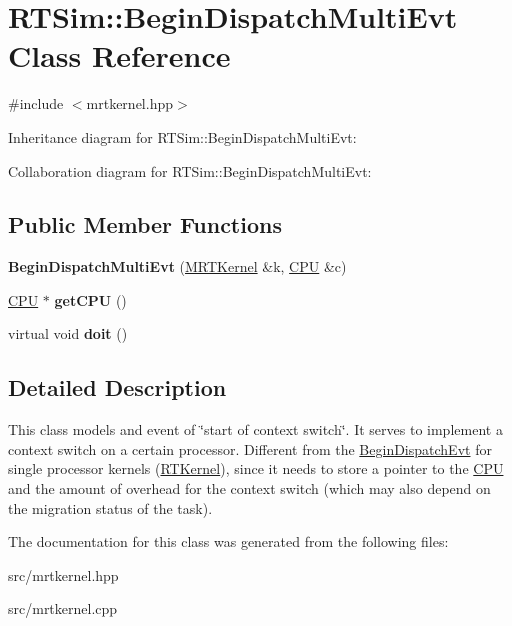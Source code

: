 \hypertarget{classRTSim_1_1BeginDispatchMultiEvt}{}\section{R\+T\+Sim\+:\+:Begin\+Dispatch\+Multi\+Evt Class Reference}
\label{classRTSim_1_1BeginDispatchMultiEvt}


{\ttfamily \#include $<$mrtkernel.\+hpp$>$}



Inheritance diagram for R\+T\+Sim\+:\+:Begin\+Dispatch\+Multi\+Evt\+:


Collaboration diagram for R\+T\+Sim\+:\+:Begin\+Dispatch\+Multi\+Evt\+:
\subsection*{Public Member Functions}
\begin{DoxyCompactItemize}
\item 
{\bfseries Begin\+Dispatch\+Multi\+Evt} (\hyperlink{classRTSim_1_1MRTKernel}{M\+R\+T\+Kernel} \&k, \hyperlink{classRTSim_1_1CPU}{C\+PU} \&c)\hypertarget{classRTSim_1_1BeginDispatchMultiEvt_a73517b699d6df307277cac0afeec7f8e}{}\label{classRTSim_1_1BeginDispatchMultiEvt_a73517b699d6df307277cac0afeec7f8e}

\item 
\hyperlink{classRTSim_1_1CPU}{C\+PU} $\ast$ {\bfseries get\+C\+PU} ()\hypertarget{classRTSim_1_1BeginDispatchMultiEvt_aebb18e69fb801e86bc079a8f91b04253}{}\label{classRTSim_1_1BeginDispatchMultiEvt_aebb18e69fb801e86bc079a8f91b04253}

\item 
virtual void {\bfseries doit} ()\hypertarget{classRTSim_1_1BeginDispatchMultiEvt_aac335c5ea99ea3e0cd5c08509ce93080}{}\label{classRTSim_1_1BeginDispatchMultiEvt_aac335c5ea99ea3e0cd5c08509ce93080}

\end{DoxyCompactItemize}


\subsection{Detailed Description}
This class models and event of \char`\"{}start of context switch\char`\"{}. It serves to implement a context switch on a certain processor. Different from the \hyperlink{classRTSim_1_1BeginDispatchEvt}{Begin\+Dispatch\+Evt} for single processor kernels (\hyperlink{classRTSim_1_1RTKernel}{R\+T\+Kernel}), since it needs to store a pointer to the \hyperlink{classRTSim_1_1CPU}{C\+PU} and the amount of overhead for the context switch (which may also depend on the migration status of the task). 

The documentation for this class was generated from the following files\+:\begin{DoxyCompactItemize}
\item 
src/mrtkernel.\+hpp\item 
src/mrtkernel.\+cpp\end{DoxyCompactItemize}
